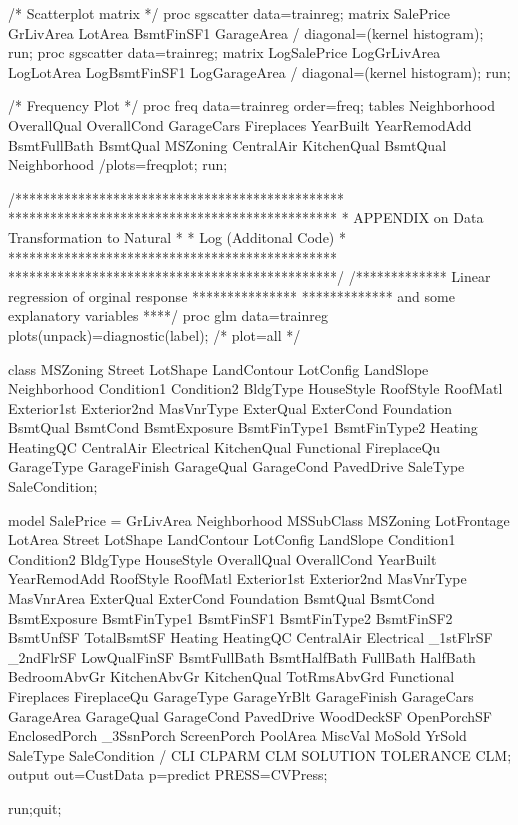 /* Scatterplot matrix */
proc sgscatter data=trainreg;
   matrix SalePrice GrLivArea LotArea BsmtFinSF1 GarageArea  / diagonal=(kernel histogram);
run;
proc sgscatter data=trainreg;
   matrix LogSalePrice LogGrLivArea LogLotArea LogBsmtFinSF1 LogGarageArea  / diagonal=(kernel histogram);
run;

/* Frequency Plot */
proc freq data=trainreg order=freq;
   tables Neighborhood OverallQual OverallCond GarageCars Fireplaces 
   YearBuilt YearRemodAdd BsmtFullBath BsmtQual
   MSZoning CentralAir KitchenQual BsmtQual Neighborhood
   /plots=freqplot;
run;

/***********************************************
 ***********************************************
 * APPENDIX on Data Transformation to Natural  *
 *              Log (Additonal Code)           *
 ***********************************************
 ***********************************************/
/************* Linear regression of orginal response ***************
 ************* and some explanatory variables  ****/ 
proc glm data=trainreg plots(unpack)=diagnostic(label);  /* plot=all */  

class MSZoning Street LotShape LandContour LotConfig LandSlope Neighborhood 
Condition1 Condition2 BldgType HouseStyle RoofStyle RoofMatl Exterior1st Exterior2nd 
MasVnrType ExterQual ExterCond Foundation BsmtQual BsmtCond BsmtExposure BsmtFinType1 
BsmtFinType2 Heating HeatingQC CentralAir Electrical KitchenQual Functional FireplaceQu 
GarageType GarageFinish GarageQual GarageCond PavedDrive
SaleType SaleCondition; 

model SalePrice = GrLivArea Neighborhood MSSubClass MSZoning LotFrontage LotArea Street LotShape LandContour  
LotConfig LandSlope Condition1 Condition2 BldgType HouseStyle OverallQual OverallCond YearBuilt 
YearRemodAdd RoofStyle RoofMatl Exterior1st Exterior2nd MasVnrType MasVnrArea ExterQual ExterCond Foundation 
BsmtQual BsmtCond BsmtExposure BsmtFinType1 BsmtFinSF1 BsmtFinType2 BsmtFinSF2 BsmtUnfSF 
TotalBsmtSF Heating HeatingQC CentralAir Electrical _1stFlrSF _2ndFlrSF LowQualFinSF 
BsmtFullBath BsmtHalfBath FullBath HalfBath BedroomAbvGr KitchenAbvGr KitchenQual TotRmsAbvGrd 
Functional Fireplaces FireplaceQu GarageType GarageYrBlt GarageFinish GarageCars GarageArea 
GarageQual GarageCond PavedDrive WoodDeckSF OpenPorchSF EnclosedPorch _3SsnPorch ScreenPorch 
PoolArea MiscVal MoSold YrSold	SaleType SaleCondition / CLI CLPARM CLM SOLUTION TOLERANCE CLM;
output out=CustData p=predict PRESS=CVPress;

run;quit;

